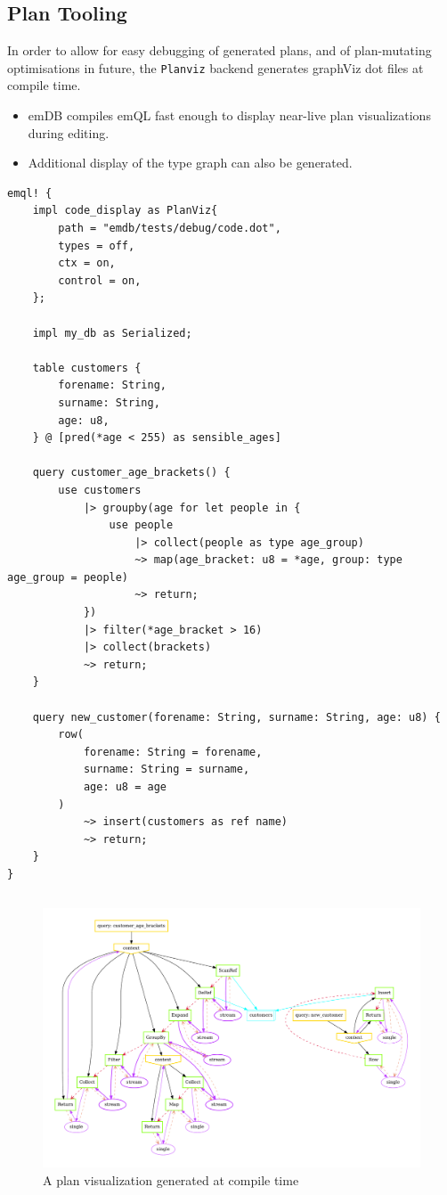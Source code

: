 \subsection{Plan Tooling}
In order to allow for easy debugging of generated plans, and of plan-mutating optimisations in future, the \texttt{Planviz} backend generates graphViz dot files at compile time.
\begin{itemize}
    \setlength\itemsep{0em}
    \item emDB compiles emQL fast enough to display near-live plan visualizations during editing.
    \item Additional display of the type graph can also be generated.
\end{itemize}
\begin{verbatim}
emql! {
    impl code_display as PlanViz{
        path = "emdb/tests/debug/code.dot",
        types = off,
        ctx = on,
        control = on,
    };

    impl my_db as Serialized;
    
    table customers {
        forename: String,
        surname: String,
        age: u8,
    } @ [pred(*age < 255) as sensible_ages]

    query customer_age_brackets() {
        use customers
            |> groupby(age for let people in {
                use people
                    |> collect(people as type age_group)
                    ~> map(age_bracket: u8 = *age, group: type age_group = people)
                    ~> return;
            })
            |> filter(*age_bracket > 16)
            |> collect(brackets)
            ~> return;
    }

    query new_customer(forename: String, surname: String, age: u8) {
        row(
            forename: String = forename,
            surname: String = surname,
            age: u8 = age
        )
            ~> insert(customers as ref name)
            ~> return;
    }
}
\end{verbatim}
\begin{figure}[h!]
    \centering
    \begin{verbatim}
    \end{verbatim}
    \includegraphics[width=\textwidth]{implementation/diagrams/code.pdf}
    \caption{A plan visualization generated at compile time}
\end{figure}



